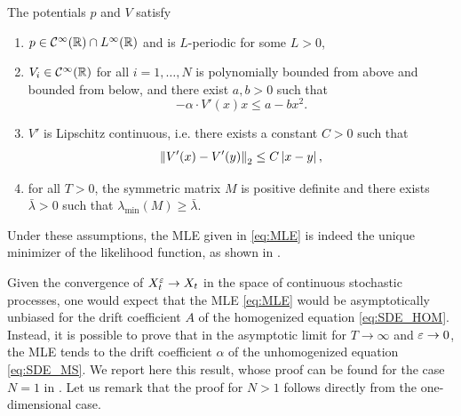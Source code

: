 \documentclass[review,onefignum,onetabnum]{siamonline190516}
\begin{document}
\begin{assumption}\label{as:regularity} The potentials $p$ and $V$ satisfy
	\begin{enumerate}
		\item $p \in \mathcal C^\infty(\mathbb{R}) \cap L^\infty(\mathbb{R})$ and is $L$-periodic for some $L > 0$,
		\item\label{as:regularity_diss} $V_i \in \mathcal C^\infty(\mathbb{R})$ for all $i=1, \ldots, N$ is polynomially bounded from above and bounded from below,  and there exist $a,b > 0$ such that
		\begin{equation}
		-\alpha \cdot V'(x) x \leq a - bx^2.
		\end{equation} 
		\item $V'$ is Lipschitz continuous, i.e. there exists a constant $C > 0$ such that
		\begin{equation}
			\left\|V'(x) - V'(y)\right\|_2 \leq C\left\lvert x - y\right\rvert,
		\end{equation} 
		\item for all $T > 0$, the symmetric matrix $M$ is positive definite and there exists $\bar \lambda > 0$ such that $\lambda_{\min}(M) \geq \bar \lambda$.
	\end{enumerate}
\end{assumption}


Under these assumptions, the MLE given in \eqref{eq:MLE} is indeed the unique minimizer of the likelihood function, as shown in \cite[Theorem 2.4]{PSV09}.

Given the convergence of $X^\varepsilon_t \to X_t$ in the space of continuous stochastic processes, one would expect that the MLE \eqref{eq:MLE} would be asymptotically unbiased for the drift coefficient $A$ of the homogenized equation \eqref{eq:SDE_HOM}. Instead, it is possible to prove that in the asymptotic limit for $T \to \infty$ and $\varepsilon \to 0$, the MLE tends to the drift coefficient $\alpha$ of the unhomogenized equation \eqref{eq:SDE_MS}. We report here this result, whose proof can be found for the case $N = 1$ in \cite[Theorem 3.4]{PaS07}. Let us remark that the proof for $N > 1$ follows directly from the one-dimensional case.
\end{document}
